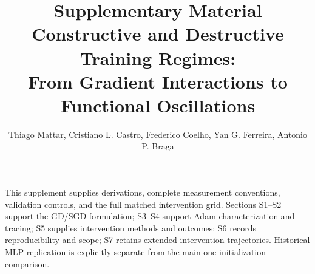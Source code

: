\documentclass[10pt]{article}
\title{Supplementary Material\\[3pt]\large Constructive and Destructive Training Regimes:\\From Gradient Interactions to Functional Oscillations}
\author{Thiago Mattar, Cristiano L. Castro, Frederico Coelho, Yan G. Ferreira, Antonio P. Braga}
\date{}
\begin{document}
\maketitle
\noindent This supplement supplies derivations, complete measurement conventions, validation controls, and the full matched intervention grid. Sections S1--S2 support the GD/SGD formulation; S3--S4 support Adam characterization and tracing; S5 supplies intervention methods and outcomes; S6 records reproducibility and scope; S7 retains extended intervention trajectories. Historical MLP replication is explicitly separate from the main one-initialization comparison.









\end{document}
